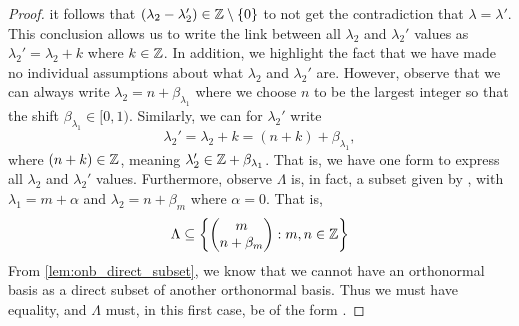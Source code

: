 \documentclass[../thesis.tex]{subfiles}
\begin{document}
\begin{proof}
    it follows that $(\lambda_2 - \lambda_2') \in \mathbb{Z}\setminus\{0\}$ to not get the contradiction that $\lambda=\lambda'$.  %
    This conclusion allows us to write the link between all $\lambda_2$ and $\lambda_2'$ values as $\lambda_2' = \lambda_2 + k$ where $k\in \mathbb{Z}$. In addition, we highlight the fact that we have made no individual assumptions about what $\lambda_2$ and $\lambda_2'$ are. However, observe that we can always write $\lambda_2 = n+\beta_{\lambda_1}$ where we choose $n$ to be the largest integer so that the shift $\beta_{\lambda_1}\in [0,1)$. Similarly, we can for $\lambda_2'$ write
    \begin{equation*}
        \lambda_2' = \lambda_2 + k = (n+k) +  \beta_{\lambda_1},
    \end{equation*}
    where $(n+k)\in \mathbb{Z}$, meaning $\lambda_2' \in \mathbb{Z} + \beta_{\lambda_1}$. That is, we have one form to express all $\lambda_2$ and $\lambda_2'$ values. %
    Furthermore, observe $\Lambda$ is, in fact, a subset given by , with $\lambda_1 = m + \alpha$ and $\lambda_2 = n+\beta_m$ where $\alpha = 0$. That is,
    \begin{equation*}  %
        \Lambda \subseteq \braqMed{\begin{pmatrix} m \\ n+\beta_m\end{pmatrix} : m,n \in \Z}
    \end{equation*} %
    From \cref{lem:onb_direct_subset}, we know that we cannot have an orthonormal basis as a direct subset of another orthonormal basis. Thus we must have equality, and $\Lambda$ must, in this first case, be of the form .


\end{proof}
\end{document}

